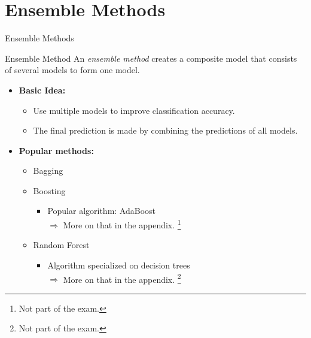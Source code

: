 \section{Ensemble Methods}

\begin{frame}{Ensemble Methods}
	\begin{block}{Ensemble Method}
		An \textit{ensemble method} creates a composite model that consists of several models to form one model.
	\end{block}
	\begin{itemize}
		\item \textbf{Basic Idea:}
		      \begin{itemize}
			      \item Use multiple models to improve classification accuracy.
			      \item The final prediction is made by combining the predictions of all models.
		      \end{itemize}
		\item \textbf{Popular methods:}
		      \begin{itemize}
			      \item Bagging
			      \item Boosting
			            \begin{itemize}
				            \item Popular algorithm: AdaBoost \\
				                  $\Rightarrow$ More on that in the appendix. \footnote{Not part of the exam.}
			            \end{itemize}
			      \item Random Forest
			            \begin{itemize}
				            \item Algorithm specialized on decision trees \\
				                  $\Rightarrow$ More on that in the appendix. \footnote{Not part of the exam.}
			            \end{itemize}
		      \end{itemize}
	\end{itemize}
\end{frame}


